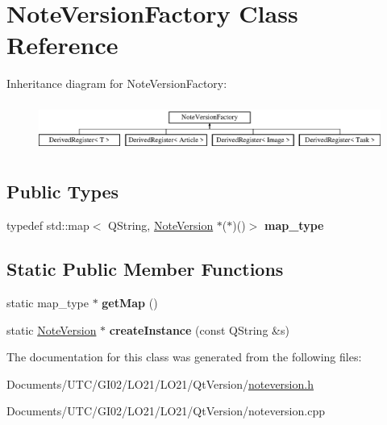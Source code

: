 \hypertarget{class_note_version_factory}{}\section{Note\+Version\+Factory Class Reference}
\label{class_note_version_factory}
Inheritance diagram for Note\+Version\+Factory\+:\begin{figure}[H]
\begin{center}
\leavevmode
\includegraphics[height=1.627907cm]{class_note_version_factory}
\end{center}
\end{figure}
\subsection*{Public Types}
\begin{DoxyCompactItemize}
\item 
\mbox{\label{class_note_version_factory_a5ee840b77e479136a07806129c4c90ef}} 
typedef std\+::map$<$ Q\+String, \hyperlink{class_note_version}{Note\+Version} $\ast$($\ast$)()$>$ {\bfseries map\+\_\+type}
\end{DoxyCompactItemize}
\subsection*{Static Public Member Functions}
\begin{DoxyCompactItemize}
\item 
\mbox{\label{class_note_version_factory_a4d4f158a1bf99ff9d88a4008ea7a31db}} 
static map\+\_\+type $\ast$ {\bfseries get\+Map} ()
\item 
\mbox{\label{class_note_version_factory_a332c745461441d4174608430789b5838}} 
static \hyperlink{class_note_version}{Note\+Version} $\ast$ {\bfseries create\+Instance} (const Q\+String \&s)
\end{DoxyCompactItemize}


The documentation for this class was generated from the following files\+:\begin{DoxyCompactItemize}
\item 
Documents/\+U\+T\+C/\+G\+I02/\+L\+O21/\+L\+O21/\+Qt\+Version/\hyperlink{noteversion_8h}{noteversion.\+h}\item 
Documents/\+U\+T\+C/\+G\+I02/\+L\+O21/\+L\+O21/\+Qt\+Version/noteversion.\+cpp\end{DoxyCompactItemize}
